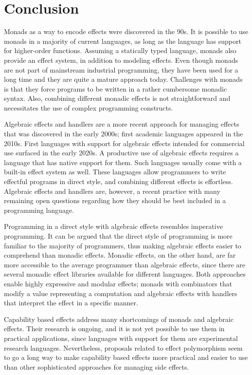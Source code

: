 \chapter{Conclusion}
Monads as a way to encode effects were discovered in the 90s. It is possible to use monads in a majority of current languages, as long as the language has support for higher-order functions. Assuming a statically typed language, monads also provide an effect system, in addition to modeling effects. Even though monads are not part of mainstream industrial programming, they have been used for a long time and they are quite a mature approach today. Challenges with monads is that they force programs to be written in a rather cumbersome monadic syntax. Also, combining different monadic effects is not straightforward and necessitates the use of complex programming constructs.

Algebraic effects and handlers are a more recent approach for managing effects that was discovered in the early 2000s; first academic languages appeared in the 2010s. First languages with support for algebraic effects intended for commercial use surfaced in the early 2020s. A productive use of algebraic effects requires a language that has native support for them. Such languages usually come with a built-in effect system as well. These languages allow programmers to write effectful programs in direct style, and combining different effects is effortless. Algebraic effects and handlers are, however, a recent practice with many remaining open questions regarding how they should be best included in a programming language.

Programming in a direct style with algebraic effects resembles imperative programming. It can be argued that the direct style of programming is more familiar to the majority of programmers, thus making algebraic effects easier to comprehend than monadic effects. Monadic effects, on the other hand, are far more accessible to the average programmer than algebraic effects, since there are several monadic effect libraries available for different languages. Both approaches enable highly expressive and modular effects; monads with combinators that modify a value representing a computation and algebraic effects with handlers that interpret the effect in a specific manner.

Capability based effects address many shortcomings of monads and algebraic effects. Their research is ongoing, and it is not yet possible to use them in practical applications, since languages with support for them are experimental research languages. Nevertheless, proposals related to effect polymorphism seem to go a long way to make capability based effects more practical and easier to use than other sophisticated approaches for managing side effects.

